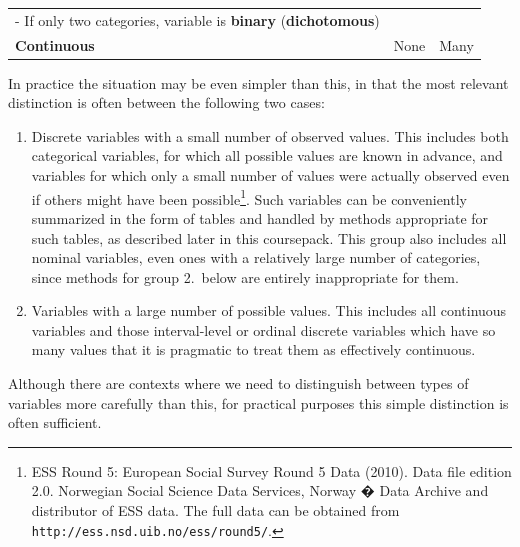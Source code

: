 \documentclass[11pt,a4paper,openany]{book}
\let\rmarkdownfootnote\footnote%
\def\footnote{\protect\rmarkdownfootnote}
\begin{document}
\begin{longtable}[]{@{}lll@{}}
\begin{minipage}[t]{0.41\columnwidth}
- If only two categories, variable is \textbf{binary}
(\textbf{dichotomous})\strut
\end{minipage} & \begin{minipage}[t]{0.27\columnwidth}\raggedright\strut
\strut
\end{minipage}\tabularnewline
\begin{minipage}[t]{0.22\columnwidth}\raggedright\strut
\textbf{Continuous}\strut
\end{minipage} & \begin{minipage}[t]{0.41\columnwidth}\raggedright\strut
None\strut
\end{minipage} & \begin{minipage}[t]{0.27\columnwidth}\raggedright\strut
Many\strut
\end{minipage}\tabularnewline
\bottomrule
\end{longtable}

In practice the situation may be even simpler than this, in that the
most relevant distinction is often between the following two cases:

\begin{enumerate}
\def\labelenumi{\arabic{enumi}.}
\item
  Discrete variables with a small number of observed values. This
  includes both categorical variables, for which all possible values are
  known in advance, and variables for which only a small number of
  values were actually observed even if others might have been
  possible\footnote{ESS Round 5: European Social Survey Round 5 Data
    (2010). Data file edition 2.0. Norwegian Social Science Data
    Services, Norway � Data Archive and distributor of ESS data. The
    full data can be obtained from
    \texttt{http://ess.nsd.uib.no/ess/round5/}.}. Such variables can be
  conveniently summarized in the form of tables and handled by methods
  appropriate for such tables, as described later in this coursepack.
  This group also includes all nominal variables, even ones with a
  relatively large number of categories, since methods for group
  2.~below are entirely inappropriate for them.
\item
  Variables with a large number of possible values. This includes all
  continuous variables and those interval-level or ordinal discrete
  variables which have so many values that it is pragmatic to treat them
  as effectively continuous.
\end{enumerate}

Although there are contexts where we need to distinguish between types
of variables more carefully than this, for practical purposes this
simple distinction is often sufficient.
\end{document}
